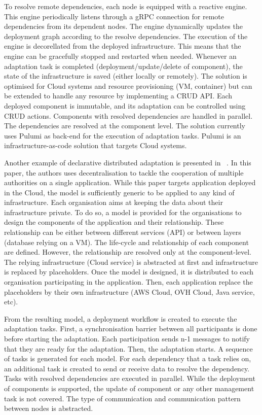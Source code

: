 \documentclass{article}
\begin{document}
To resolve remote dependencies, each node is equipped with a reactive engine. This engine periodically listens through a gRPC connection for remote dependencies from its dependent nodes. The engine dynamically updates the deployment graph according to the resolve dependencies. The execution of the engine is decorellated from the deployed infrastructure. This means that the engine can be gracefully stopped and restarted when needed. Whenever an adaptation task is completed (\eg deployment/update/delete of component), the state of the infrastructure is saved (either locally or remotely). The solution is optimised for Cloud systems and resource provisioning (\eg VM, container) but can be extended to handle any resource by implementing a CRUD API. Each deployed component is immutable, and its adaptation can be controlled using CRUD actions. Components with resolved dependencies are handled in parallel. The dependencies are resolved at the component level. The solution currently uses Pulumi as back-end for the execution of adaptation tasks. Pulumi is an infrastructure-as-code solution that targets Cloud systems.

Another example of declarative distributed adaptation is presented in ~\cite{crossorga_decentralized_2020}. In this paper, the authors uses decentralisation to tackle the cooperation of multiple authorities on a single application. While this paper targets application deployed in the Cloud, the model is sufficiently generic to be applied to any kind of infrastructure. Each organisation aims at keeping the data about their infrastructure private. To do so, a model is provided for the organisations to design the components of the application and their relationship. These relationship can be either between different services (\eg API) or between layers (\eg database relying on a VM). The life-cycle and relationship of each component are defined. However, the relationship are resolved only at the component-level. The relying infrastructure (\eg Cloud service) is abstracted at first and infrastructure is replaced by placeholders. Once the model is designed, it is distributed to each organisation participating in the application. Then, each application replace the placeholders by their own infrastructure (\eg AWS Cloud, OVH Cloud, Java service, etc). 

From the resulting model, a deployment workflow is created to execute the adaptation tasks. First, a synchronisation barrier between all participants is done before starting the adaptation. Each participation sends n-1 messages to notify that they are ready for the adaptation. Then, the adaptation starts. A sequence of tasks is generated for each model. For each dependency that a task relies on, an additional task is created to send or receive data to resolve the dependency. Tasks with resolved dependencies are executed in parallel. While the deployment of components is supported, the update of component or any other management task is not covered. The type of communication and communication pattern between nodes is abstracted.
\end{document}
